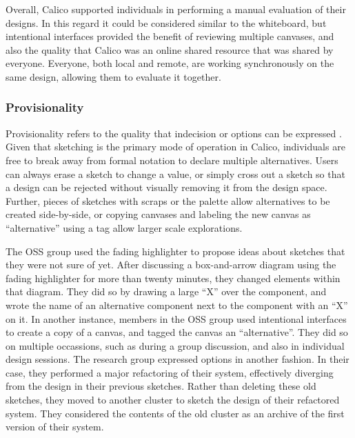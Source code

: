 Overall, Calico supported individuals in performing a manual evaluation of their designs. In this regard it could be considered similar to the whiteboard, but intentional interfaces provided the benefit of reviewing multiple canvases, and also the quality that Calico was an online shared resource that was shared by everyone. Everyone, both local and remote, are working synchronously on the same design, allowing them to evaluate it together.


\subsubsection{Provisionality}
Provisionality refers to the quality that indecision or options can be expressed \cite{Petre2013BookChapter}. Given that sketching is the primary mode of operation in Calico, individuals are free to break away from formal notation to declare multiple alternatives. Users can always erase a sketch to change a value, or simply cross out a sketch so that a design can be rejected without visually removing it from the design space. Further, pieces of sketches with scraps or the palette allow alternatives to be created side-by-side, or copying canvases and labeling the new canvas as ``alternative'' using a tag allow larger scale explorations.


The OSS group used the fading highlighter to propose ideas about sketches that they were not sure of yet. After discussing a box-and-arrow diagram using the fading highlighter for more than twenty minutes, they changed elements within that diagram. They did so by drawing a large ``X'' over the component, and wrote the name of an alternative component next to the component with an ``X'' on it. In another instance, members in the OSS group used intentional interfaces to create a copy of a canvas, and tagged the canvas an ``alternative''. They did so on multiple occassions, such as during a group discussion, and also in individual design sessions. The research group expressed options in another fashion. In their case, they performed a major refactoring of their system, effectively diverging from the design in their previous sketches. Rather than deleting these old sketches, they moved to another cluster to sketch the design of their refactored system. They considered the contents of the old cluster as an archive of the first version of their system. 

